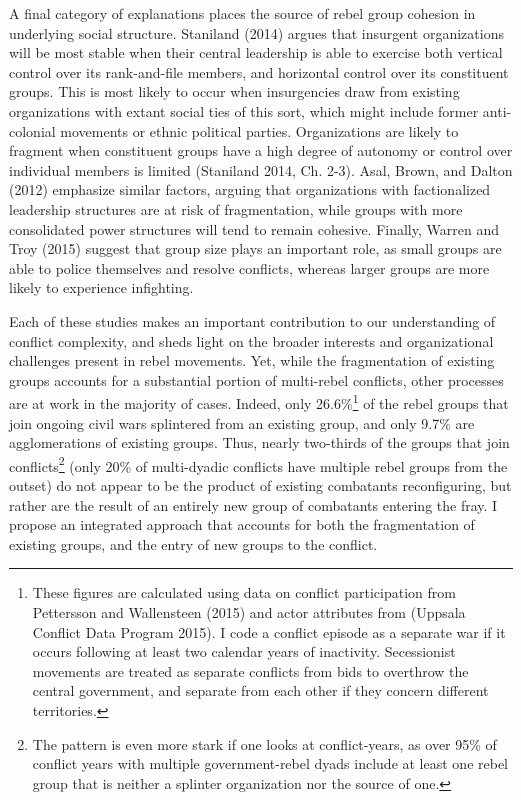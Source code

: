 \documentclass[12pt,]{article}
\let\rmarkdownfootnote\footnote%
\def\footnote{\protect\rmarkdownfootnote}
\begin{document}
A final category of explanations places the source of rebel group
cohesion in underlying social structure. Staniland (2014) argues that
insurgent organizations will be most stable when their central
leadership is able to exercise both vertical control over its
rank-and-file members, and horizontal control over its constituent
groups. This is most likely to occur when insurgencies draw from
existing organizations with extant social ties of this sort, which might
include former anti-colonial movements or ethnic political parties.
Organizations are likely to fragment when constituent groups have a high
degree of autonomy or control over individual members is limited
(Staniland 2014, Ch. 2-3). Asal, Brown, and Dalton (2012) emphasize
similar factors, arguing that organizations with factionalized
leadership structures are at risk of fragmentation, while groups with
more consolidated power structures will tend to remain cohesive.
Finally, Warren and Troy (2015) suggest that group size plays an
important role, as small groups are able to police themselves and
resolve conflicts, whereas larger groups are more likely to experience
infighting.

Each of these studies makes an important contribution to our
understanding of conflict complexity, and sheds light on the broader
interests and organizational challenges present in rebel movements. Yet,
while the fragmentation of existing groups accounts for a substantial
portion of multi-rebel conflicts, other processes are at work in the
majority of cases. Indeed, only 26.6\%\footnote{These figures are
  calculated using data on conflict participation from Pettersson and
  Wallensteen (2015) and actor attributes from (Uppsala Conflict Data
  Program 2015). I code a conflict episode as a separate war if it
  occurs following at least two calendar years of inactivity.
  Secessionist movements are treated as separate conflicts from bids to
  overthrow the central government, and separate from each other if they
  concern different territories.} of the rebel groups that join ongoing
civil wars splintered from an existing group, and only 9.7\% are
agglomerations of existing groups. Thus, nearly two-thirds of the groups
that join conflicts\footnote{The pattern is even more stark if one looks
  at conflict-years, as over 95\% of conflict years with multiple
  government-rebel dyads include at least one rebel group that is
  neither a splinter organization nor the source of one.} (only 20\% of
multi-dyadic conflicts have multiple rebel groups from the outset) do
not appear to be the product of existing combatants reconfiguring, but
rather are the result of an entirely new group of combatants entering
the fray. I propose an integrated approach that accounts for both the
fragmentation of existing groups, and the entry of new groups to the
conflict.
\end{document}
